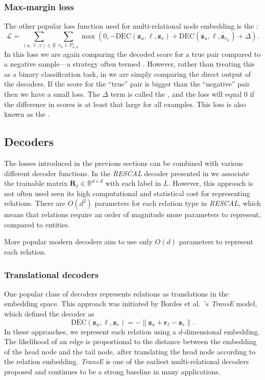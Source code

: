 \subsubsection{Max-margin loss}
The other popular loss function used for multi-relational node embedding is the :
\begin{equation}\label{eq:marginLoss}
    \mathcal{L} = \sum_{(u,\ell,v)\in E} \sum_{v_n\in P_{n,u}} \max(0, -\text{DEC}(\mathbf{z}_u, \ell, \mathbf{z}_v) + \text{DEC}(\mathbf{z}_u, \ell, \mathbf{z}_{v_n}) + \Delta).
\end{equation}
In this loss we are again comparing the decoded score for a true pair compared to a negative sample---a strategy often termed . However, rather than treating this as a binary classification task, in  we are simply comparing the direct output of the decoders. If the score for the ``true'' pair is bigger than the ``negative'' pair then we have a small loss. The $\Delta$ term is called the , and the loss will equal 0 if the difference in scores is at least that large for all examples. This loss is also known as the .

\subsection{Decoders}
The losses introduced in the previous sections can be combined with various different decoder functions. In the \textit{RESCAL} decoder presented in  we associate the trainable matrix $\mathbf{R}_\ell\in\mathbb{R}^{d\times d}$ with each label in $L$. However, this approach is not often used seen its high computational and statistical cost for representing relations. There are $O(d^2)$ parameters for each relation type in \textit{RESCAL}, which means that relations require an order of magnitude more parameters to represent, compared to entities.

More popular modern decoders aim to use only $O(d)$ parameters to represent each relation. 

\subsubsection{Translational decoders}
One popular class of decoders represents relations as translations in the embedding space. This approach was initiated by Bordes et al.~\cite{Bordes2013TransE}'s \textit{TransE} model, which defined the decoder as
\begin{equation*}
    \text{DEC}(\mathbf{z}_u, \ell, \mathbf{z}_v) = -\|\mathbf{z}_u + \mathbf{r}_\ell - \mathbf{z}_v\|.
\end{equation*}
In these approaches, we represent each relation using a $d$-dimensional embedding. The likelihood of an edge is proportional to the distance between the embedding of the head node and the tail node, after translating the head node according to the relation embedding. \textit{TransE} is one of the earliest multi-relational decoders proposed and continues to be a strong baseline in many applications.

